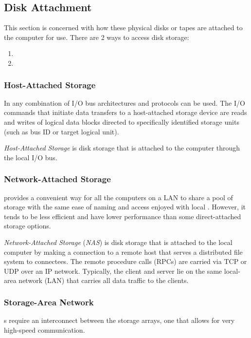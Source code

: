 \subsection{Disk Attachment}\label{subsec:Disk_Attachment}
This section is concerned with how these physical disks or tapes are attached to the computer for use.
There are 2 ways to access disk storage:
\begin{enumerate}[noitemsep]
\item {}
\item {}
\end{enumerate}

\subsubsection{Host-Attached Storage}\label{subsubsec:Host_Attached_Storage}
In  any combination of I/O bus architectures and protocols can be used.
The I/O commands that initiate data transfers to a host-attached storage device are reads and writes of logical data blocks directed to specifically identified storage units (such as bus ID or target logical unit).

\begin{definition}\label{def:Host_Attached_Storage}
  \emph{Host-Attached Storage} is disk storage that is attached to the computer through the local I/O bus.
\end{definition}

\subsubsection{Network-Attached Storage}\label{subsubsec:Network_Attached_Storage}
 provides a convenient way for all the computers on a LAN to share a pool of storage with the same ease of naming and access enjoyed with local .
However, it tends to be less efficient and have lower performance than some direct-attached storage options.

\begin{definition}\label{def:Network_Attached_Storage}
  \emph{Network-Attached Storage} (\emph{NAS}) is disk storage that is attached to the local computer by making a connection to a remote host that serves a distributed file system to connectees.
  The remote procedure calls (RPCs) are carried via TCP or UDP over an IP network.
  Typically, the client and server lie on the same local-area network (LAN) that carries all data traffic to the clients.
\end{definition}

\subsubsection{Storage-Area Network}\label{subsubsec:Storage_Area_Network}
s require an interconnect between the storage arrays, one that allows for very high-speed communication.


